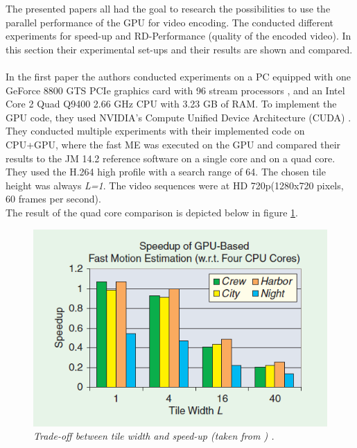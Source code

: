 The presented papers all had the goal to research the possibilities to use the parallel performance of the GPU for video encoding. The conducted different experiments for speed-up and RD-Performance (quality of the encoded video). In this section their experimental set-ups and their results are shown and compared.\\
\\
In the first paper \cite{Paper1} the authors conducted experiments on a PC equipped with one GeForce 8800 GTS PCIe graphics card with 96 stream processors \cite{geforce8800}, and an Intel Core 2 Quad Q9400 2.66 GHz CPU with 3.23 GB of RAM. To implement the GPU code, they used NVIDIA's Compute Unified Device Architecture (CUDA) \cite{nvidia2programming}. \\
They conducted multiple experiments with their implemented code on CPU+GPU, where the fast ME was executed on the GPU and compared their results to the JM 14.2 reference software on a single core and on a quad core. They used the H.264 high profile with a search range of 64. The chosen tile height was always \textit{L=1}. The video sequences were at HD 720p(1280x720 pixels, 60 frames per second).\\
The result of the quad core comparison is depicted below in figure \ref{tiling_speedup_mc}.
\begin{figure}[H]
\centerline{\includegraphics[scale=0.4]{pics/tiling_speedup_mc}} %
\caption{\label{tiling_speedup_mc}{
\it Trade-off between tile width and speed-up (taken from \cite{Paper1})
.
}}
\end{figure} 

